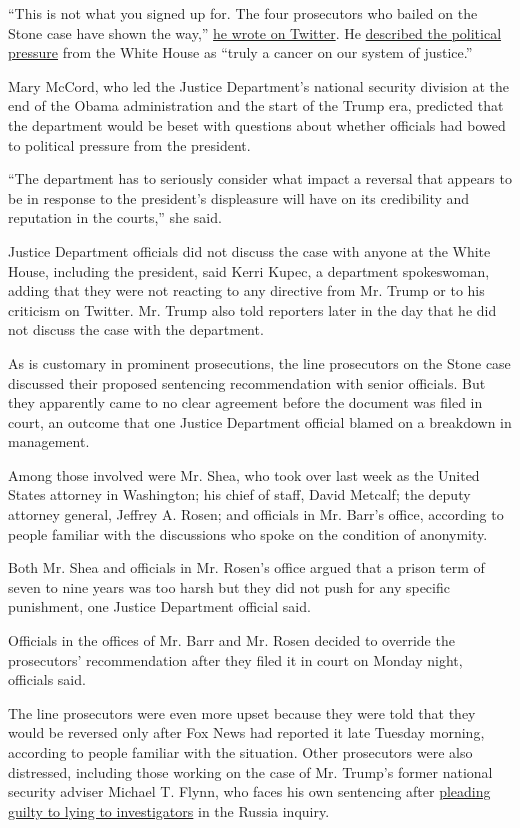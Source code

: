 ``This is not what you signed up for. The four prosecutors who bailed on
the Stone case have shown the way,''
\href{https://twitter.com/mrbromwich/status/1227411988030132225}{he
wrote on Twitter}. He
\href{https://twitter.com/mrbromwich/status/1227298957627396096}{described
the political pressure} from the White House as ``truly a cancer on our
system of justice.''

Mary McCord, who led the Justice Department's national security division
at the end of the Obama administration and the start of the Trump era,
predicted that the department would be beset with questions about
whether officials had bowed to political pressure from the president.

``The department has to seriously consider what impact a reversal that
appears to be in response to the president's displeasure will have on
its credibility and reputation in the courts,'' she said.

Justice Department officials did not discuss the case with anyone at the
White House, including the president, said Kerri Kupec, a department
spokeswoman, adding that they were not reacting to any directive from
Mr. Trump or to his criticism on Twitter. Mr. Trump also told reporters
later in the day that he did not discuss the case with the department.

As is customary in prominent prosecutions, the line prosecutors on the
Stone case discussed their proposed sentencing recommendation with
senior officials. But they apparently came to no clear agreement before
the document was filed in court, an outcome that one Justice Department
official blamed on a breakdown in management.

Among those involved were Mr. Shea, who took over last week as the
United States attorney in Washington; his chief of staff, David Metcalf;
the deputy attorney general, Jeffrey A. Rosen; and officials in Mr.
Barr's office, according to people familiar with the discussions who
spoke on the condition of anonymity.

Both Mr. Shea and officials in Mr. Rosen's office argued that a prison
term of seven to nine years was too harsh but they did not push for any
specific punishment, one Justice Department official said.

Officials in the offices of Mr. Barr and Mr. Rosen decided to override
the prosecutors' recommendation after they filed it in court on Monday
night, officials said.

The line prosecutors were even more upset because they were told that
they would be reversed only after Fox News had reported it late Tuesday
morning, according to people familiar with the situation. Other
prosecutors were also distressed, including those working on the case of
Mr. Trump's former national security adviser Michael T. Flynn, who faces
his own sentencing after
\href{https://www.nytimes.com/2017/12/01/us/politics/michael-flynn-guilty-russia-investigation.html}{pleading
guilty to lying to investigators} in the Russia inquiry.

